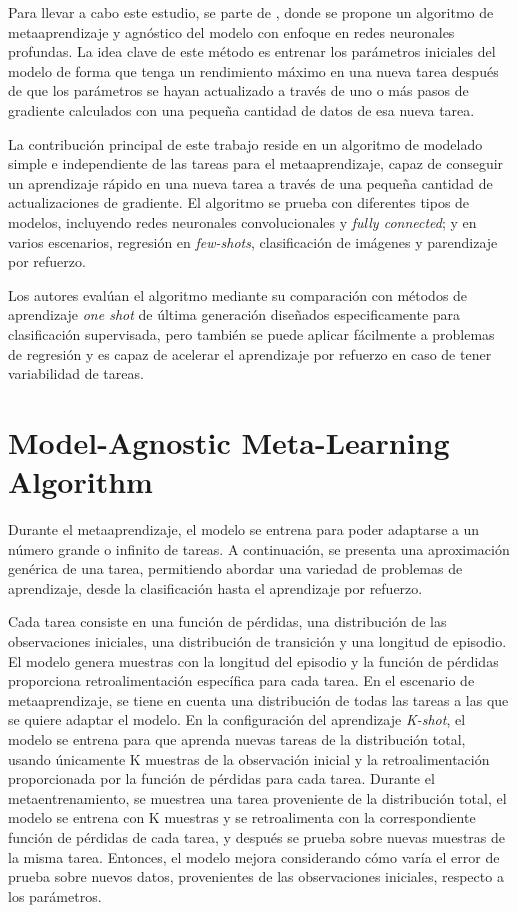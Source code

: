 Para llevar a cabo este estudio, se parte de \cite{finn2017modelagnostic}, donde se propone un algoritmo de metaaprendizaje y agnóstico del modelo con enfoque en redes neuronales profundas. La idea clave de este método es entrenar los parámetros iniciales del modelo de forma que tenga un rendimiento máximo en una nueva tarea después de que los parámetros se hayan actualizado a través de uno o más pasos de gradiente calculados con una pequeña cantidad de datos de esa nueva tarea.

La contribución principal de este trabajo reside en un algoritmo de modelado simple e independiente de las tareas para el metaaprendizaje, capaz de conseguir un aprendizaje rápido en una nueva tarea a través de una pequeña cantidad de actualizaciones de gradiente. El algoritmo se prueba con diferentes tipos de modelos, incluyendo redes neuronales convolucionales y \emph{fully connected}; y en varios escenarios, regresión en \emph{few-shots}, clasificación de imágenes y parendizaje por refuerzo.

Los autores evalúan el algoritmo mediante su comparación con métodos de aprendizaje \emph{one shot} de última generación diseñados especificamente para clasificación supervisada, pero también se puede aplicar fácilmente a problemas de regresión y es capaz de acelerar el aprendizaje por refuerzo en caso de tener variabilidad de tareas.

\section{Model-Agnostic Meta-Learning Algorithm}

Durante el metaaprendizaje, el modelo se entrena para poder adaptarse a un número grande o infinito de tareas. A continuación, se presenta una aproximación genérica de una tarea, permitiendo abordar una variedad de problemas de aprendizaje, desde la clasificación hasta el aprendizaje por refuerzo.

Cada tarea consiste en una función de pérdidas, una distribución de las observaciones iniciales, una distribución de transición y una longitud de episodio. El modelo genera muestras con la longitud del episodio y la función de pérdidas proporciona retroalimentación específica para cada tarea.
En el escenario de metaaprendizaje, se tiene en cuenta una distribución de todas las tareas a las que se quiere adaptar el modelo. En la configuración del aprendizaje \emph{K-shot}, el modelo se entrena para que aprenda nuevas tareas de la distribución total, usando únicamente K muestras de la observación inicial y la retroalimentación proporcionada por la función de pérdidas para cada tarea. Durante el metaentrenamiento, se muestrea una tarea proveniente de la distribución total, el modelo se entrena con K muestras y se retroalimenta con la correspondiente función de pérdidas de cada tarea, y después se prueba sobre nuevas muestras de la misma tarea. Entonces, el modelo mejora considerando cómo varía el error de prueba sobre nuevos datos, provenientes de las observaciones iniciales, respecto a los parámetros.

